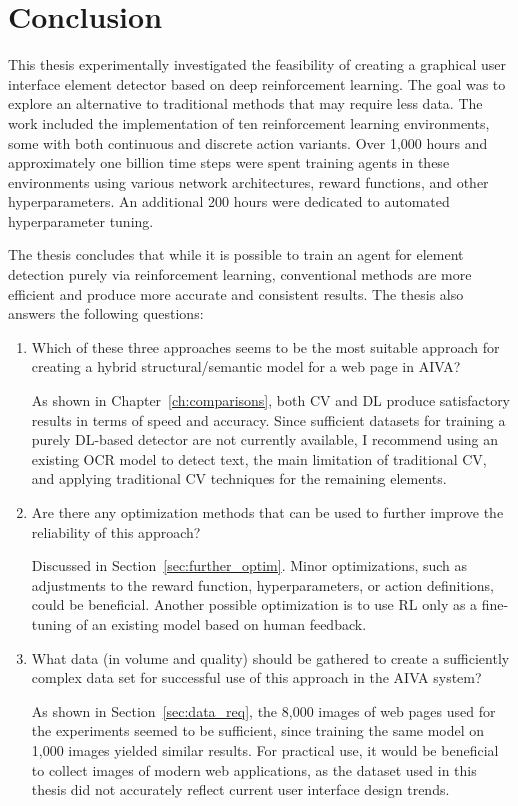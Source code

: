 \documentclass[
  digital,     %
  oneside,     %
  nosansbold,  %
  nocolorbold, %
  lof,         %
  lot,         %
]{fithesis4}
\begin{document}
\chapter*{Conclusion}
This thesis experimentally investigated the feasibility of creating a graphical user interface element detector based on deep reinforcement learning. The goal was to explore an alternative to traditional methods that may require less data. The work included the implementation of ten reinforcement learning environments, some with both continuous and discrete action variants. Over 1,000 hours and approximately one billion time steps were spent training agents in these environments using various network architectures, reward functions, and other hyperparameters. An additional 200 hours were dedicated to automated hyperparameter tuning.

The thesis concludes that while it is possible to train an agent for element detection purely via reinforcement learning, conventional methods are more efficient and produce more accurate and consistent results. The thesis also answers the following questions:

\begin{enumerate}
    \item Which of these three approaches seems to be the most suitable approach for creating a hybrid structural/semantic model for a web page in AIVA?

    As shown in Chapter~\ref{ch:comparisons}, both CV and DL produce satisfactory results in terms of speed and accuracy. Since sufficient datasets for training a purely DL-based detector are not currently available, I recommend using an existing OCR model to detect text, the main limitation of traditional CV, and applying traditional CV techniques for the remaining elements.

    \item Are there any optimization methods that can be used to further improve the reliability of this approach?

    Discussed in Section~\ref{sec:further_optim}. Minor optimizations, such as adjustments to the reward function, hyperparameters, or action definitions, could be beneficial. Another possible optimization is to use RL only as a fine-tuning of an existing model based on human feedback.

    \item What data (in volume and quality) should be gathered to create a sufficiently complex data set for successful use of this approach in the AIVA system?

    As shown in Section~\ref{sec:data_req}, the 8,000 images of web pages used for the experiments seemed to be sufficient, since training the same model on 1,000 images yielded similar results. For practical use, it would be beneficial to collect images of modern web applications, as the dataset used in this thesis did not accurately reflect current user interface design trends.
\end{enumerate}
\end{document}
